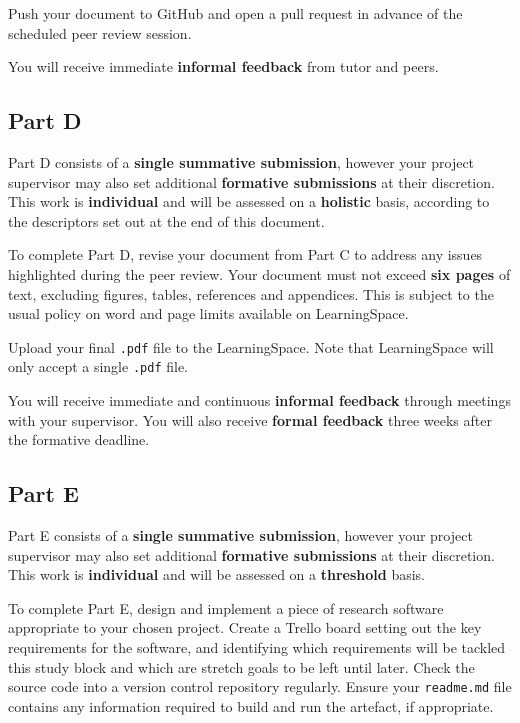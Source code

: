 \documentclass{../fal_assignment}
\begin{document}
Push your document to GitHub and open a pull request
in advance of the scheduled peer review session.

You will receive immediate \textbf{informal feedback} from tutor and peers.

\subsection*{Part D}

Part D consists of a \textbf{single summative submission},
however your project supervisor may also set additional \textbf{formative submissions} at their discretion.
This work is \textbf{individual} and will be assessed on a \textbf{holistic} basis,
according to the descriptors set out at the end of this document.

To complete Part D, revise your document from Part C
to address any issues highlighted during the peer review.
Your document must not exceed \textbf{six pages} of text,
excluding figures, tables, references and appendices.
This is subject to the usual policy on word and page limits available on LearningSpace.

Upload your final \texttt{.pdf} file to the LearningSpace.
Note that LearningSpace will only accept a single \texttt{.pdf} file.

You will receive immediate and continuous \textbf{informal feedback} through meetings with your supervisor.
You will also receive \textbf{formal feedback} three weeks after the formative deadline.

\subsection*{Part E}

Part E consists of a \textbf{single summative submission},
however your project supervisor may also set additional \textbf{formative submissions} at their discretion.
This work is \textbf{individual} and will be assessed on a \textbf{threshold} basis.

To complete Part E, design and implement a piece of research software appropriate to your chosen project.
Create a Trello board setting out the key requirements for the software,
and identifying which requirements will be tackled this study block
and which are stretch goals to be left until later.
Check the source code into a version control repository regularly.
Ensure your \texttt{readme.md} file contains any information required to build and run the artefact, if appropriate.
\end{document}
